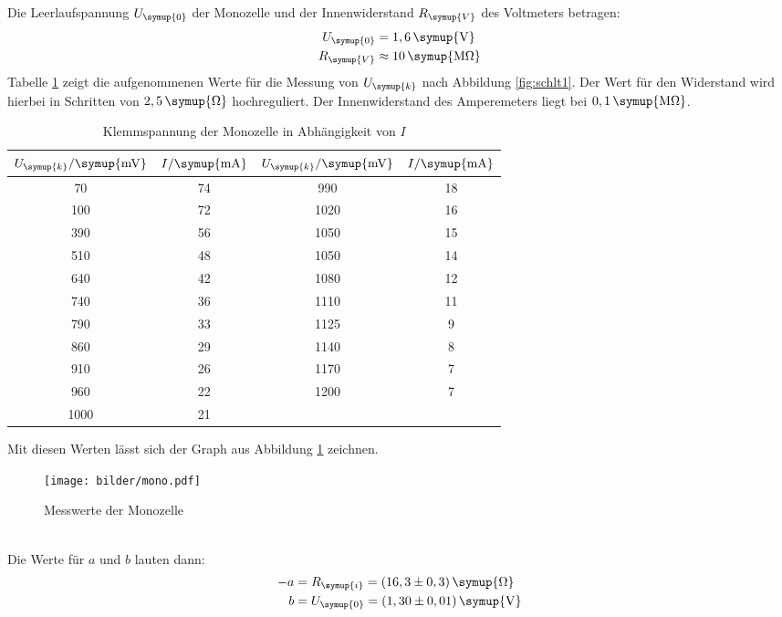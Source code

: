 Die Leerlaufspannung $U_\symup{0}$ der Monozelle und der Innenwiderstand
$R_\symup{V}$ des Voltmeters betragen:
\begin{align*}
  U_\symup{0} &= 1,6 \,\symup{\si{\volt}} \\
  R_\symup{V} &\approx 10\,\symup{\si{\mega\ohm}}
\end{align*}
Tabelle \ref{tab:U_k} zeigt die aufgenommenen Werte für die Messung von
$U_\symup{k}$ nach Abbildung \ref{fig:schlt1}. Der Wert für den Widerstand wird
hierbei in Schritten von $2,5\,\symup{\si\ohm}$ hochreguliert. Der Innenwiderstand
des Amperemeters liegt bei $0,1\,\symup{\si{\mega\ohm}}$.
\begin{table}[H]
  \centering
  \begin{tabular}{c c c c}
    \toprule
    $U_{\symup{k}}/\symup{\si{\milli\volt}}$ & $I/\symup{\si{\milli\ampere}}$  &
    $U_{\symup{k}}/\symup{\si{\milli\volt}}$ & $I/\symup{\si{\milli\ampere}}$  \\
    \midrule
      70  &  74  &   990  &  18  \\
     100  &  72  &  1020  &  16  \\
     390  &  56  &  1050  &  15  \\
     510  &  48  &  1050  &  14  \\
     640  &  42  &  1080  &  12  \\
     740  &  36  &  1110  &  11  \\
     790  &  33  &  1125  &   9  \\
     860  &  29  &  1140  &   8  \\
     910  &  26  &  1170  &   7  \\
     960  &  22  &  1200  &   7  \\
    1000  &  21  &  \hrulefill  & \hrulefill  \\
    \bottomrule
  \end{tabular}
  \caption{Klemmspannung der Monozelle in Abhängigkeit von $I$}
  \label{tab:U_k}
\end{table}
Mit diesen Werten lässt sich der Graph aus Abbildung \ref{fig:mono} zeichnen.
\begin{figure}[h]
  \centering
  \texttt{[image: bilder/mono.pdf]}
  \caption{Messwerte der Monozelle}
  \label{fig:mono}
\end{figure}
\\
Die Werte für $a$ und $b$ lauten dann:
\begin{align*}
  -a &= R_\symup{i} = (16,3 \pm 0,3)\, \symup{\si{\ohm}} \\
   b &= U_\symup{0} = (1,30 \pm 0,01)\, \symup{\si{\volt}}
\end{align*}
